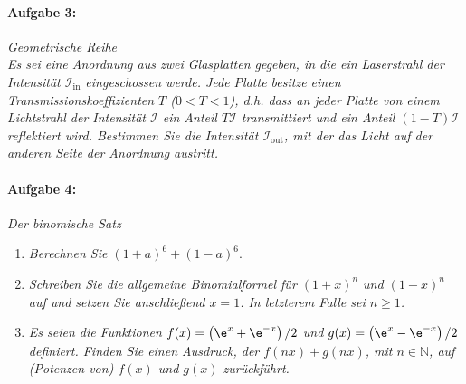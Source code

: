 \paragraph{Aufgabe 3: } \emph{Geometrische Reihe}\\[0.2cm]
\emph{Es sei eine Anordnung aus zwei Glasplatten gegeben, in die ein Laserstrahl der Intensität $\mathcal{I}_\text{in}$ eingeschossen werde. Jede Platte besitze einen Transmissionskoeffizienten $T$ ($0<T<1$), d.h. dass an jeder Platte von einem Lichtstrahl der Intensität $\mathcal{I}$ ein Anteil $T \mathcal{I}$ transmittiert und ein Anteil $(1-T)\mathcal{I}$ reflektiert wird.
Bestimmen Sie die Intensität $\mathcal{I}_\text{out}$, mit der das Licht auf der anderen Seite der Anordnung austritt.}\\
\begin{center}
    \vspace{-1cm}
\vspace{-2cm}
\end{center}
%
\newpage
\paragraph{Aufgabe 4: } \emph{Der binomische Satz}
\begin{enumerate}[label=(\alph*)]
\item \emph{Berechnen Sie $(1+a)^6+(1-a)^6$}.
\item \emph{Schreiben Sie die allgemeine Binomialformel für $(1+x)^n$ und $(1-x)^n$ auf und setzen Sie anschließend $x=1$. In letzterem Falle sei $n\ge 1$.}
\item \emph{Es seien die Funktionen $f(x)=\left(\e^{x}+\e^{-x}\right)/2$ und $g(x)=\left(\e^{x}-\e^{-x}\right)/2$ definiert. Finden Sie einen Ausdruck, der $f(nx)+g(nx)$, mit $n\in\mathbb{N}$, auf (Potenzen von) $f(x)$ und $g(x)$ zurückführt.}
\end{enumerate}
%
